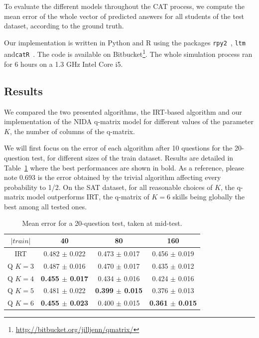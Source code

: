 \documentclass{sig-alternate}
\begin{document}
To evaluate the different models throughout the CAT process, we compute the mean error of the whole vector of predicted answers for all students of the test dataset, according to the ground truth.

Our implementation is written in Python and R using the packages \texttt{rpy2}~\citep{Gautier2008}, \texttt{ltm}~\citep{Rizopoulos2006} and\linebreak \texttt{catR}~\citep{MagisRaiche2012}. The code is available on Bitbucket\footnote{\url{http://bitbucket.org/jilljenn/qmatrix/}}. The whole simulation process ran for 6 hours on a 1.3 GHz Intel Core i5.

\subsection{Results}

We compared the two presented algorithms, the IRT-based algorithm and our implementation of the NIDA q-matrix model for different values of the parameter $K$, the number of columns of the q-matrix.

We will first focus on the error of each algorithm after 10 questions for the 20-question test, for different sizes of the train dataset. Results are detailed in Table~\ref{tab:20q} where the best performances are shown in bold. As a reference, please note 0.693 is the error obtained by the trivial algorithm affecting every probability to 1/2. On the SAT dataset, for all reasonable choices of $K$, the q-matrix model outperforms IRT, the q-matrix of $K = 6$ skills being globally the best among all tested ones.

\begin{table}[H]
\small\centering\begin{tabular}{@{}cccc@{}}
$|train|$ & 40 & 80 & 160\\
\hline
IRT & 0.482 $\pm$ 0.022 & 0.473 $\pm$ 0.017 & 0.456 $\pm$ 0.019\\
Q $K = 3$ & 0.487 $\pm$ 0.016 & 0.470 $\pm$ 0.017 & 0.435 $\pm$ 0.012\\
Q $K = 4$ & \textbf{0.455 $\pm$ 0.017} & 0.434 $\pm$ 0.016 & 0.424 $\pm$ 0.016\\
Q $K = 5$ & 0.481 $\pm$ 0.022 & \textbf{0.399 $\pm$ 0.015} & 0.376 $\pm$ 0.013\\
Q $K = 6$ & \textbf{0.455 $\pm$ 0.023} & 0.400 $\pm$ 0.015 & \textbf{0.361 $\pm$ 0.015}\\
\end{tabular}
\caption{Mean error for a 20-question test, taken at mid-test.}
\label{tab:20q}
\end{table}
\end{document}
